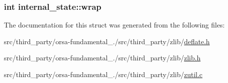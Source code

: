 \subsubsection[{wrap}]{\setlength{\rightskip}{0pt plus 5cm}int internal\+\_\+state\+::wrap}\label{structinternal__state_ae80327ea7ad4ad0ef5baeef5ef3a6807}


The documentation for this struct was generated from the following files\+:\begin{DoxyCompactItemize}
\item 
src/third\+\_\+party/orsa-\/fundamental\+\_./src/third\+\_\+party/zlib/\hyperlink{deflate_8h}{deflate.\+h}\item 
src/third\+\_\+party/orsa-\/fundamental\+\_./src/third\+\_\+party/zlib/\hyperlink{zlib_8h}{zlib.\+h}\item 
src/third\+\_\+party/orsa-\/fundamental\+\_./src/third\+\_\+party/zlib/\hyperlink{zutil_8c}{zutil.\+c}\end{DoxyCompactItemize}
